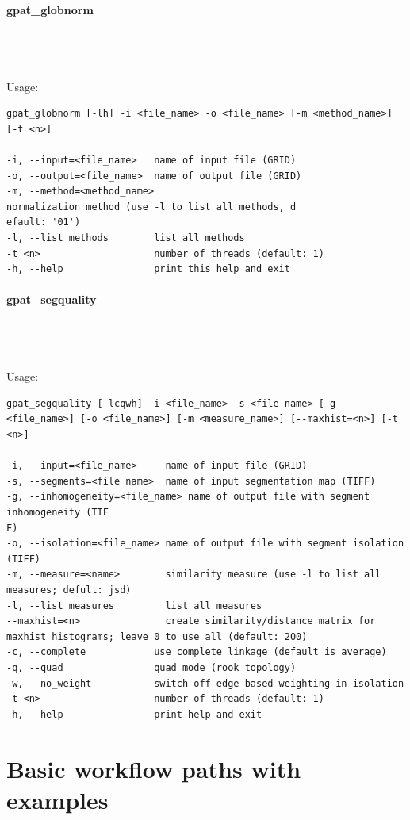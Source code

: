 \documentclass[12pt,margin=0.5in]{article}
\newcommand{\newparagraph}[1]{\paragraph{#1}\mbox{}\\}
\begin{document}
\newparagraph{gpat\_globnorm}
{}
\\\\
Usage:
\begin{lstlisting}[frame=single]
gpat_globnorm [-lh] -i <file_name> -o <file_name> [-m <method_name>] [-t <n>]

-i, --input=<file_name>   name of input file (GRID)
-o, --output=<file_name>  name of output file (GRID)
-m, --method=<method_name> 
normalization method (use -l to list all methods, d
efault: '01')
-l, --list_methods        list all methods
-t <n>                    number of threads (default: 1)
-h, --help                print this help and exit
\end{lstlisting}

\newparagraph{gpat\_segquality}
{}
\\\\
Usage:
\begin{lstlisting}[frame=single]
gpat_segquality [-lcqwh] -i <file_name> -s <file name> [-g <file_name>] [-o <file_name>] [-m <measure_name>] [--maxhist=<n>] [-t <n>]

-i, --input=<file_name>     name of input file (GRID)
-s, --segments=<file name>  name of input segmentation map (TIFF)
-g, --inhomogeneity=<file_name> name of output file with segment inhomogeneity (TIF
F)
-o, --isolation=<file_name> name of output file with segment isolation (TIFF)
-m, --measure=<name>        similarity measure (use -l to list all measures; defult: jsd)
-l, --list_measures         list all measures
--maxhist=<n>               create similarity/distance matrix for maxhist histograms; leave 0 to use all (default: 200)
-c, --complete            use complete linkage (default is average)
-q, --quad                quad mode (rook topology)
-w, --no_weight           switch off edge-based weighting in isolation
-t <n>                    number of threads (default: 1)
-h, --help                print help and exit
\end{lstlisting}

\section{Basic workflow paths with examples}
\end{document}

